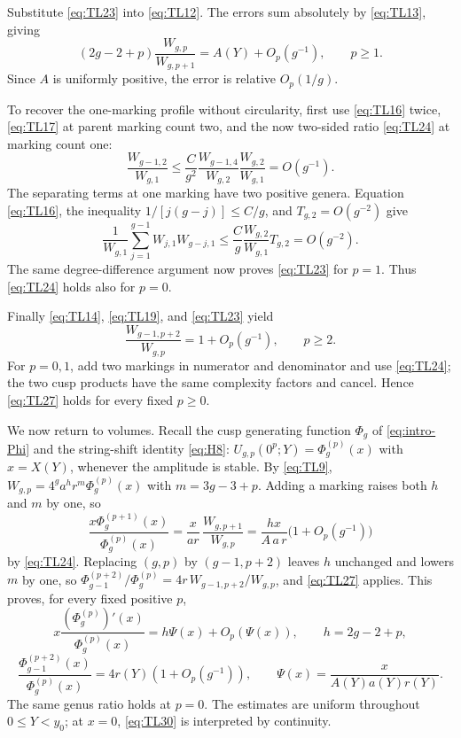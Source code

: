 Substitute \eqref{eq:TL23} into \eqref{eq:TL12}. The errors sum absolutely by \eqref{eq:TL13},
giving \begin{equation}
(2g-2+p)\frac{W_{g,p}}{W_{g,p+1}}
 =A(Y)+O_p(g^{-1}),\qquad p\ge1.
 \label{eq:TL24}
\end{equation} Since \(A\) is uniformly positive, the error is relative
\(O_p(1/g)\).

To recover the one-marking profile without circularity, first use \eqref{eq:TL16}
twice, \eqref{eq:TL17} at parent marking count two, and the now two-sided ratio
\eqref{eq:TL24} at marking count one: \begin{equation}
\frac{W_{g-1,2}}{W_{g,1}}
 \le\frac C{g^2}\frac{W_{g-1,4}}{W_{g,2}}
 \frac{W_{g,2}}{W_{g,1}}=O(g^{-1}).
 \label{eq:TL25}
\end{equation} The separating terms at one marking have two positive genera.
Equation \eqref{eq:TL16}, the inequality \(1/[j(g-j)]\le C/g\), and
\(T_{g,2}=O(g^{-2})\) give \begin{equation}
\frac1{W_{g,1}}\sum_{j=1}^{g-1}W_{j,1}W_{g-j,1}
 \le\frac Cg\frac{W_{g,2}}{W_{g,1}}T_{g,2}=O(g^{-2}).
 \label{eq:TL26}
\end{equation} The same degree-difference argument now proves \eqref{eq:TL23} for \(p=1\).
Thus \eqref{eq:TL24} holds also for \(p=0\).

Finally \eqref{eq:TL14}, \eqref{eq:TL19}, and \eqref{eq:TL23} yield \begin{equation}
\frac{W_{g-1,p+2}}{W_{g,p}}=1+O_p(g^{-1}),\qquad p\ge2.
 \label{eq:TL27}
\end{equation} For \(p=0,1\), add two markings in numerator and denominator and use
\eqref{eq:TL24}; the two cusp products have the same complexity factors and
cancel. Hence \eqref{eq:TL27} holds for every fixed \(p\ge0\).

We now return to volumes. Recall the cusp generating function
\(\Phi_g\) of \eqref{eq:intro-Phi} and the string-shift identity
\eqref{eq:H8}: \(U_{g,p}(0^p;Y)=\Phi_g^{(p)}(x)\) with \(x=X(Y)\), whenever
the amplitude is stable. By \eqref{eq:TL9},
\(W_{g,p}=4^ga^hr^m\Phi_g^{(p)}(x)\) with \(m=3g-3+p\). Adding a marking
raises both \(h\) and \(m\) by one, so
\[
 \frac{x\Phi_g^{(p+1)}(x)}{\Phi_g^{(p)}(x)}
 =\frac{x}{ar}\,\frac{W_{g,p+1}}{W_{g,p}}
 =\frac{hx}{A\,a\,r}\bigl(1+O_p(g^{-1})\bigr)
\]
by \eqref{eq:TL24}. Replacing \((g,p)\) by \((g-1,p+2)\) leaves \(h\)
unchanged and lowers \(m\) by one, so
\(\Phi_{g-1}^{(p+2)}/\Phi_g^{(p)}=4r\,W_{g-1,p+2}/W_{g,p}\), and
\eqref{eq:TL27} applies. This proves, for every fixed positive \(p\),
\begin{equation}
x\frac{(\Phi_g^{(p)})'(x)}{\Phi_g^{(p)}(x)}
 =h\Psi(x)+O_p(\Psi(x)),\qquad h=2g-2+p,
 \label{eq:TL30}
\end{equation} \begin{equation}
\frac{\Phi_{g-1}^{(p+2)}(x)}{\Phi_g^{(p)}(x)}
 =4r(Y)(1+O_p(g^{-1})),
 \qquad
 \Psi(x)=\frac{x}{A(Y)a(Y)r(Y)}.
 \label{eq:TL31}
\end{equation} The same genus ratio holds at \(p=0\). The estimates are uniform
throughout \(0\le Y<y_0\); at \(x=0\), \eqref{eq:TL30} is interpreted by
continuity.

